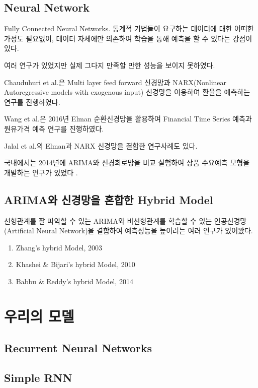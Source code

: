 \documentclass[a4paper, amsmath, 10pt, twocolumn]{oblivoir}
\begin{document}
\subsection{Neural Network}
Fully Connected Neural Networks. 통계적 기법들이 요구하는 데이터에 대한 어떠한 가정도 필요없이, 데이터 자체에만 의존하여 학습을 통해 예측을 할 수 있다는 강점이 있다.

여러 연구가 있었지만 실제 그다지 만족할 만한 성능을 보이지 못하였다.

Chauduhuri et al.은 Multi layer feed forward 신경망과 NARX(Nonlinear Autoregressive models with exogenous input) 신경망을 이용하여 환율을 예측하는 연구를 진행하였다.\cite{chaudhuri2016}

Wang et al.은 2016년 Elman 순환신경망을 활용하여 Financial Time Series 예측과 원유가격 예측 연구를 진행하였다. \cite{wang2016a} \cite{wang2016b}


Jalal et al.의 Elman과 NARX 신경망을 결합한 연구사례도 있다.

국내에서는 2014년에 ARIMA와 신경회로망을 비교 실험하여 상품 수요예측 모형을 개발하는 연구가 있었다 \cite{ljh2014}.

\subsection{ARIMA와 신경망을 혼합한 Hybrid Model}
선형관계를 잘 파악할 수 있는 ARIMA와 비선형관계를 학습할 수 있는 인공신경망(Artificial Neural Network)을 결합하여 예측성능을 높이려는 여러 연구가 있어왔다.

\begin{enumerate}
\item Zhang's hybrid Model, 2003\cite{zhang2003}
\item Khashei \& Bijari's hybrid Model, 2010\cite{khashei2010}
\item Babbu \& Reddy's hybrid Model, 2014\cite{babu2014}
\end{enumerate}

\section{우리의 모델}


\subsection{Recurrent Neural Networks}

\subsection{Simple RNN}
\end{document}
